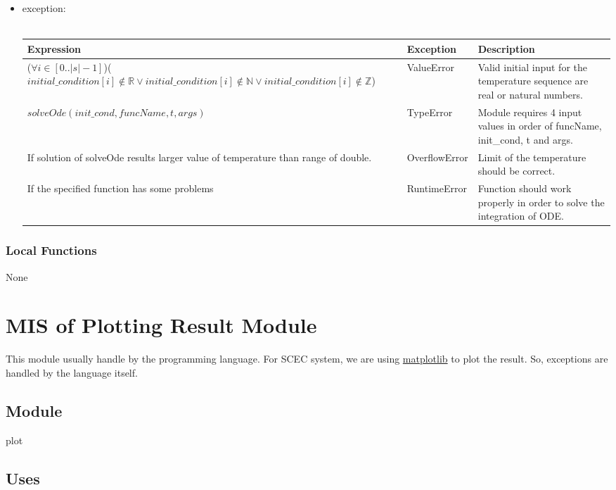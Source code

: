 \documentclass[12pt, titlepage]{article}
\begin{document}
\begin{itemize}
\item exception: \\ \\ 
\begin{tabular}{p{7cm} p{3.5cm} p{4cm}}
 \hline
 \textbf{Expression} & \textbf{Exception} & \textbf{Description} \\
 \hline
     ($\forall i \in [0..|s|-1]$)($initial\_condition[i] \notin \mathbb{R} \vee initial\_condition[i] \notin \mathbb{N} \vee initial\_condition[i] \notin \mathbb{Z}$) & ValueError & Valid initial input for the temperature sequence are real or natural numbers. \\
  \hline
      $solveOde(init\_cond, funcName, t, args)$  & TypeError & Module requires 4 input values in order of funcName, init\_cond, t and args.  \\
    \hline
    If solution of solveOde results larger value of temperature than range of double. & OverflowError & Limit of the temperature should be correct. \\
    \hline 
    If the specified function has some problems &  RuntimeError & Function should work properly in order to solve the integration of ODE. \\ 
    \hline
 \end{tabular}
\end{itemize}

\subsubsection{Local Functions}

None

\section{MIS of Plotting Result Module} \label{Plotting_Result_Module} 

This module usually handle by the programming language. For SCEC system, we are using \href{https://matplotlib.org/stable/tutorials/introductory/pyplot.html}{matplotlib} to plot the result. So, exceptions are handled by the language itself. 
\subsection{Module}

plot

\subsection{Uses}
\end{document}
